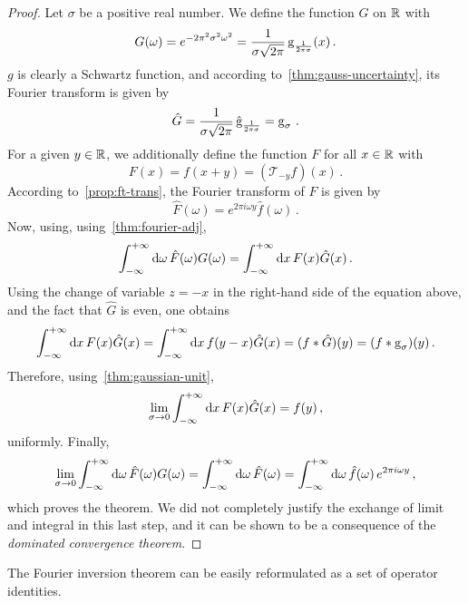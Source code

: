 \begin{proof}
  Let $\sigma$ be a positive real number. We define the function $G$ on $\mathbb{R}$ with
  \begin{equation}
    G(\omega)=e^{-2\pi^2\sigma^2\omega^2}
    =\frac{1}{\sigma\sqrt{2\pi}}\operatorname{g}_{\frac{1}{2\pi\sigma}}(x)\,.
  \end{equation}
  $g$ is clearly a Schwartz function, and according to~\cref{thm:gauss-uncertainty}, its
  Fourier transform is given by
  \begin{equation}
    \hat{G}=\frac{1}{\sigma\sqrt{2\pi}}\,\hat{\operatorname{g}}_{\frac{1}{2\pi\sigma}}
    =\operatorname{g}_{\sigma}\,.
  \end{equation}
  For a given $y\in\mathbb{R}$, we additionally define the function $F$ for all $x\in\mathbb{R}$ with
  \begin{equation}
    F(x)=f(x+y)=(\mathcal{T}_{-y}f)(x)\,.
  \end{equation}
  According to~\cref{prop:ft-trans}, the Fourier transform of $F$ is given by
  \begin{equation}
    \hat{F}(\omega)=e^{2\pi i\omega y}\hat{f}(\omega)\,.
  \end{equation}
  Now, using, using~\cref{thm:fourier-adj},
  \begin{equation}
    \int_{-\infty}^{+\infty}\mathrm{d}{\omega}\,\hat{F}(\omega)G(\omega)=\int_{-\infty}^{+\infty}\mathrm{d}{x}\,F(x)\hat{G}(x)\,.
  \end{equation}
  Using the change of variable $z=-x$ in the right-hand side of the equation above, and
  the fact that $\hat{G}$ is even, one obtains
  \begin{equation}
    \int_{-\infty}^{+\infty}\mathrm{d}{x}\,F(x)\hat{G}(x)=\int_{-\infty}^{+\infty}\mathrm{d}{x}\,f(y-x)\hat{G}(x)=(f\ast\hat{G})(y)
    =(f\ast\operatorname{g}_{\sigma})(y)\,.
  \end{equation}
  Therefore, using~\cref{thm:gaussian-unit},
  \begin{equation}
    \lim_{\sigma\to 0}\int_{-\infty}^{+\infty}\mathrm{d}{x}\,F(x)\hat{G}(x)=f(y)\,,
  \end{equation}
  uniformly. Finally,
  \begin{equation}
    \lim_{\sigma\to 0}\int_{-\infty}^{+\infty}\mathrm{d}{\omega}\,\hat{F}(\omega)G(\omega)=
    \int_{-\infty}^{+\infty}\mathrm{d}{\omega}\,\hat{F}(\omega)=\int_{-\infty}^{+\infty}\mathrm{d}{\omega}\,\hat{f}(\omega)\,e^{2\pi i\omega y}\,,
  \end{equation}
  which proves the theorem. We did not completely justify the exchange of limit and
  integral in this last step, and it can be shown to be a consequence of the
  \emph{dominated convergence theorem}.
\end{proof}
The Fourier inversion theorem can be easily reformulated as a set of operator identities.
